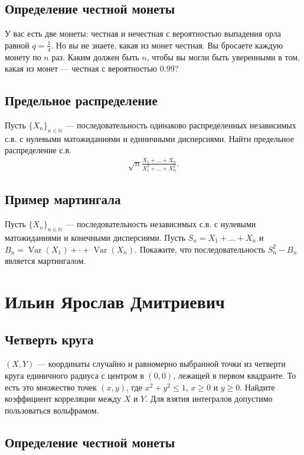 \documentclass[12pt]{article}
\newcommand\N{\mathbb{N}}
\DeclareMathOperator{\Var}{Var}
\begin{document}
\subsection{Определение честной монеты}

У вас есть две монеты: честная и нечестная с вероятностью выпадения орла равной $q = \frac{1}{4}$. Но вы не знаете, какая из монет честная. Вы бросаете каждую монету по $n$ раз. Каким должен быть $n$, чтобы вы могли быть уверенными в том, какая из монет --- честная с вероятностью $0.99$? 


\subsection{Предельное распределение}

Пусть $\{X_n\}_{n \in \N}$ --- последовательность одинаково распределенных независимых с.в. с нулевыми матожиданиями и единичными дисперсиями. Найти предельное распределение с.в.
\begin{align*}
    \sqrt{n}\frac{X_1 + \dots + X_n}{X_1^2 + \dots + X_n^2}.
\end{align*}

\subsection{Пример мартингала}

Пусть $\{X_n\}_{n \in \N}$ --- последовательность независимых с.в. с нулевыми матожиданиями и конечными дисперсиями. Пусть $S_n = X_1 + \dots + X_n$ и $B_n = \Var(X_1) + \cdot + \Var(X_n)$. Покажите, что последовательность $S_n^2 - B_n$ является мартингалом.


\newpage
\section{Ильин Ярослав Дмитриевич}

\subsection{Четверть круга}

$(X, Y)$ --- координаты случайно и равномерно выбранной точки из четверти круга единичного радиуса с центром в $(0, 0)$, лежащей в первом квадранте. То есть это множество точек $(x, y)$, где $x^2 + y^2 \le 1$, $x \ge 0$ и $y \ge 0$. Найдите коэффициент корреляции между $X$ и $Y$. Для взятия интегралов  допустимо пользоваться вольфрамом.


\subsection{Определение честной монеты}
\end{document}
